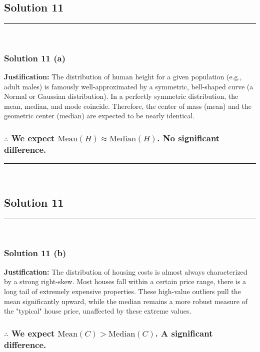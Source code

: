 \documentclass{article}
\begin{document}
\newpage
\subsection*{Solution 11}
\noindent\rule{\textwidth}{0.4pt}\\
\subsubsection*{Solution  11 (a)}

\parbox{\textwidth}{
    \textbf{Justification:} The distribution of human height for a given population (e.g., adult males) is famously well-approximated by a symmetric, bell-shaped curve (a Normal or Gaussian distribution). In a perfectly symmetric distribution, the mean, median, and mode coincide. Therefore, the center of mass (mean) and the geometric center (median) are expected to be nearly identical.
}

\subsubsection*{\normalfont $\therefore$ We expect $\text{Mean}(H) \approx \text{Median}(H)$. No significant difference.}

\noindent\rule{\textwidth}{0.4pt}\\

\newpage
\subsection*{Solution 11}
\noindent\rule{\textwidth}{0.4pt}\\
\subsubsection*{Solution  11 (b)}

\parbox{\textwidth}{
    \textbf{Justification:} The distribution of housing costs is almost always characterized by a strong right-skew. Most houses fall within a certain price range, there is a long tail of extremely expensive properties. These high-value outliers pull the mean significantly upward, while the median remains a more robust measure of the "typical" house price, unaffected by these extreme values.
}

\subsubsection*{\normalfont $\therefore$ We expect $\text{Mean}(C) > \text{Median}(C)$. A significant difference.}
\end{document}
